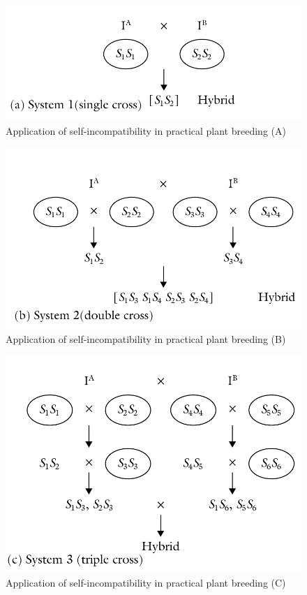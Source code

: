 \documentclass[11pt,ignorenonframetext,aspectratio=169]{beamer}
\begin{document}
\begin{frame}{}
\protect\hypertarget{section-11}{}
\begin{figure}

{\centering \includegraphics[width=0.5\linewidth]{./images/incompatibility_use_SC} 

}

\caption{Application of self-incompatibility in practical plant breeding (A)}\label{fig:si-use-sc}
\end{figure}
\end{frame}

\begin{frame}{}
\protect\hypertarget{section-12}{}
\begin{figure}

{\centering \includegraphics[width=0.5\linewidth]{./images/incompatibility_use_DC} 

}

\caption{Application of self-incompatibility in practical plant breeding (B)}\label{fig:si-use-dc}
\end{figure}
\end{frame}

\begin{frame}{}
\protect\hypertarget{section-13}{}
\begin{figure}

{\centering \includegraphics[width=0.5\linewidth]{./images/incompatibility_use_TC} 

}

\caption{Application of self-incompatibility in practical plant breeding (C)}\label{fig:si-use-tc}
\end{figure}
\end{frame}
\end{document}
